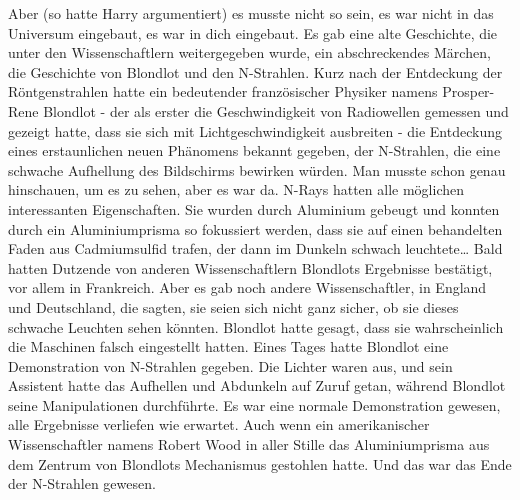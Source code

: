 {Aber (so hatte Harry argumentiert) es musste nicht so sein, es war nicht in das Universum eingebaut, es war in dich eingebaut. Es gab eine alte Geschichte, die unter den Wissenschaftlern weitergegeben wurde, ein abschreckendes Märchen, die Geschichte von Blondlot und den N-Strahlen. Kurz nach der Entdeckung der Röntgenstrahlen hatte ein bedeutender französischer Physiker namens Prosper-Rene Blondlot - der als erster die Geschwindigkeit von Radiowellen gemessen und gezeigt hatte, dass sie sich mit Lichtgeschwindigkeit ausbreiten - die Entdeckung eines erstaunlichen neuen Phänomens bekannt gegeben, der N-Strahlen, die eine schwache Aufhellung des Bildschirms bewirken würden. Man musste schon genau hinschauen, um es zu sehen, aber es war da. N-Rays hatten alle möglichen interessanten Eigenschaften. Sie wurden durch Aluminium gebeugt und konnten durch ein Aluminiumprisma so fokussiert werden, dass sie auf einen behandelten Faden aus Cadmiumsulfid trafen, der dann im Dunkeln schwach leuchtete… Bald hatten Dutzende von anderen Wissenschaftlern Blondlots Ergebnisse bestätigt, vor allem in Frankreich. Aber es gab noch andere Wissenschaftler, in England und Deutschland, die sagten, sie seien sich nicht ganz sicher, ob sie dieses schwache Leuchten sehen könnten. Blondlot hatte gesagt, dass sie wahrscheinlich die Maschinen falsch eingestellt hatten. Eines Tages hatte Blondlot eine Demonstration von N-Strahlen gegeben. Die Lichter waren aus, und sein Assistent hatte das Aufhellen und Abdunkeln auf Zuruf getan, während Blondlot seine Manipulationen durchführte. Es war eine normale Demonstration gewesen, alle Ergebnisse verliefen wie erwartet. Auch wenn ein amerikanischer Wissenschaftler namens Robert Wood in aller Stille das Aluminiumprisma aus dem Zentrum von Blondlots Mechanismus gestohlen hatte. Und das war das Ende der N-Strahlen gewesen.

}
